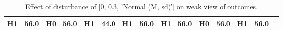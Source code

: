 \begin{table}
\begin{tabular}{l|cc|cc|cc|cc|cc|cc|cc}
\cellcolor{Bittersweet}H1&\cellcolor{Bittersweet}56.0&\cellcolor{Bittersweet}H0&\cellcolor{Bittersweet}56.0&\cellcolor{Bittersweet}H1&\cellcolor{Bittersweet}44.0&\cellcolor{Bittersweet}H1&\cellcolor{Bittersweet}56.0&\cellcolor{Bittersweet}H1&\cellcolor{Bittersweet}56.0&\cellcolor{Bittersweet}H0&\cellcolor{Bittersweet}56.0&\cellcolor{Bittersweet}H1&\cellcolor{Bittersweet}56.0\\\bottomrule\end{tabular}\caption{Effect of disturbance of [0, 0.3, 'Normal (M, sd)'] on weak view of outcomes.}\end{table}